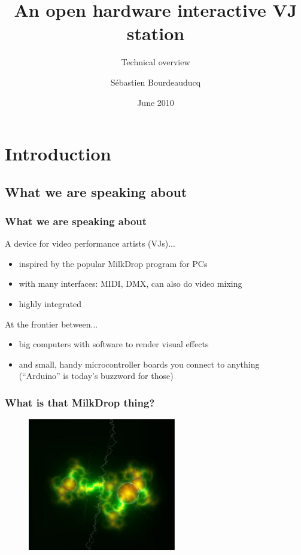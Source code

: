 \documentclass{beamer}
\title{An open hardware interactive VJ station}
\subtitle{Technical overview}
\author{S\'ebastien Bourdeauducq}
\date{June 2010}
\begin{document}

\section{Introduction}
\subsection{What we are speaking about}
\frame
{
  \frametitle{What we are speaking about}
A device for video performance artists (VJs)...
  \begin{itemize}
  \item inspired by the popular MilkDrop program for PCs
  \item with many interfaces: MIDI, DMX, can also do video mixing
  \item highly integrated
  \end{itemize}

At the frontier between...
  \begin{itemize}
  \item big computers with software to render visual effects
  \item and small, handy microcontroller boards you connect to anything\\(``Arduino'' is today's buzzword for those)
  \end{itemize}
}

\frame
{
  \frametitle{What is that MilkDrop thing?}
  \begin{figure}[H]
  \includegraphics[height=58mm]{milkdrop1.eps}
  \end{figure}
}
\end{document}
